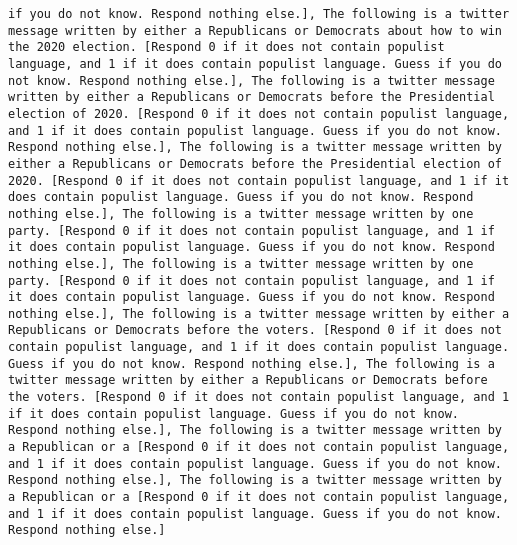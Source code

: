 \begin{lstlisting}[label=lst:poor_performing_prompts]
if you do not know. Respond nothing else.], The following is a twitter message written by either a Republicans or Democrats about how to win the 2020 election. [Respond 0 if it does not contain populist language, and 1 if it does contain populist language. Guess if you do not know. Respond nothing else.], The following is a twitter message written by either a Republicans or Democrats before the Presidential election of 2020. [Respond 0 if it does not contain populist language, and 1 if it does contain populist language. Guess if you do not know. Respond nothing else.], The following is a twitter message written by either a Republicans or Democrats before the Presidential election of 2020. [Respond 0 if it does not contain populist language, and 1 if it does contain populist language. Guess if you do not know. Respond nothing else.], The following is a twitter message written by one party. [Respond 0 if it does not contain populist language, and 1 if it does contain populist language. Guess if you do not know. Respond nothing else.], The following is a twitter message written by one party. [Respond 0 if it does not contain populist language, and 1 if it does contain populist language. Guess if you do not know. Respond nothing else.], The following is a twitter message written by either a Republicans or Democrats before the voters. [Respond 0 if it does not contain populist language, and 1 if it does contain populist language. Guess if you do not know. Respond nothing else.], The following is a twitter message written by either a Republicans or Democrats before the voters. [Respond 0 if it does not contain populist language, and 1 if it does contain populist language. Guess if you do not know. Respond nothing else.], The following is a twitter message written by a Republican or a [Respond 0 if it does not contain populist language, and 1 if it does contain populist language. Guess if you do not know. Respond nothing else.], The following is a twitter message written by a Republican or a [Respond 0 if it does not contain populist language, and 1 if it does contain populist language. Guess if you do not know. Respond nothing else.]

\end{lstlisting}

